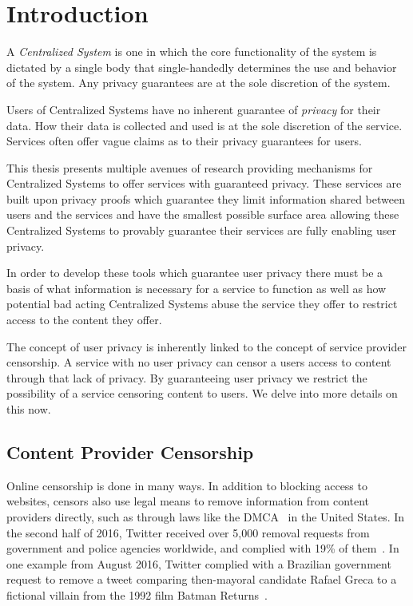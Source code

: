 \chapter{Introduction}

A \emph{Centralized System} is one in which the core functionality of the
system is dictated by a single body that single-handedly determines the use and
behavior of the system. Any privacy guarantees are at the sole discretion of the
system.

Users of Centralized Systems have no inherent guarantee of \emph{privacy} for 
their data. How their data is collected and used is at the sole discretion of
the service. Services often offer vague claims as to their privacy guarantees
for users.

This thesis presents multiple avenues of research providing mechanisms for
Centralized Systems to offer services with guaranteed privacy. These services
are built upon privacy proofs which guarantee they limit information shared
between users and the services and have the smallest possible surface area
allowing these Centralized Systems to provably guarantee their services are
fully enabling user privacy.

In order to develop these tools which guarantee user privacy there must be a
basis of what information is necessary for a service to function as well as how
potential bad acting Centralized Systems abuse the service they offer to
restrict access to the content they offer.

The concept of user privacy is inherently linked to the concept of service
provider censorship. A service with no user privacy can censor a users access to
content through that lack of privacy. By guaranteeing user privacy we restrict
the possibility of a service censoring content to users. We delve into more
details on this now.

\section{Content Provider Censorship}
Online censorship is done in many ways. In addition to blocking access to
websites, censors also use legal means to remove information from content
providers directly, such as through laws like the DMCA~\cite{dmca} in the United
States. In the second half of 2016, Twitter received over 5,000 removal requests
from government and police agencies worldwide, and complied with 19\% of
them~\cite{twitter-transparency}. In one example from August 2016, Twitter
complied with a Brazilian government request to remove a tweet comparing
then-mayoral candidate Rafael Greca to a fictional villain from the 1992 film
Batman Returns~\cite{twitter-rafael-greca}.


